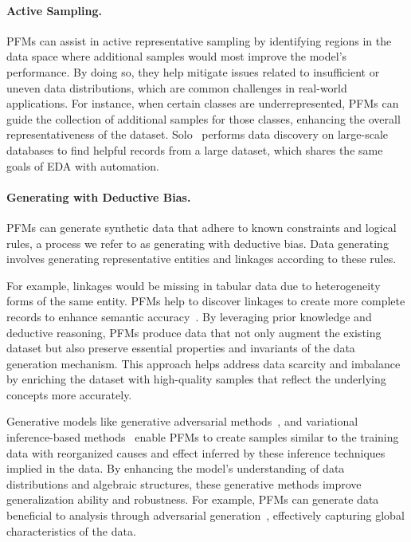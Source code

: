 \paragraph{Active Sampling.}

PFMs can assist in active representative sampling by identifying regions in the data space where additional samples would most improve the model's performance. By doing so, they help mitigate issues related to insufficient or uneven data distributions, which are common challenges in real-world applications. For instance, when certain classes are underrepresented, PFMs can guide the collection of additional samples for those classes, enhancing the overall representativeness of the dataset. Solo~\cite{Wang2023SoloDD} performs data discovery on large-scale databases to find helpful records from a large dataset, which shares the same goals of EDA with automation.

\paragraph{Generating with Deductive Bias.}

PFMs can generate synthetic data that adhere to known constraints and logical rules, a process we refer to as generating with deductive bias. Data generating involves generating representative entities and linkages according to these rules. 


For example, linkages would be missing in tabular data due to heterogeneity forms of the same entity. PFMs help to discover linkages to create more complete records to enhance semantic accuracy~\cite{Nobari2023DTTAE}. By leveraging prior knowledge and deductive reasoning, PFMs produce data that not only augment the existing dataset but also preserve essential properties and invariants of the data generation mechanism. This approach helps address data scarcity and imbalance by enriching the dataset with high-quality samples that reflect the underlying concepts more accurately.

Generative models like generative adversarial methods~\cite{Loem2023SAIEFS}, and variational inference-based methods~\cite{huamortizing} enable PFMs to create samples similar to the training data with reorganized causes and effect inferred by these inference techniques implied in the data. By enhancing the model's understanding of data distributions and algebraic structures, these generative methods improve generalization ability and robustness. For example, PFMs can generate data beneficial to analysis through adversarial generation~\cite{du2024enhancing,weng2023g}, effectively capturing global characteristics of the data.

